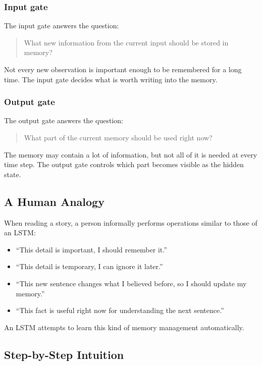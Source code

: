 \subsubsection{Input gate}

The input gate answers the question:
\begin{quote}
What new information from the current input should be stored in memory?
\end{quote}

Not every new observation is important enough to be remembered for a long time. The input gate decides what is worth writing into the memory.

\subsubsection{Output gate}

The output gate answers the question:
\begin{quote}
What part of the current memory should be used right now?
\end{quote}

The memory may contain a lot of information, but not all of it is needed at every time step. The output gate controls which part becomes visible as the hidden state.

\subsection{A Human Analogy}

When reading a story, a person informally performs operations similar to those of an LSTM:
\begin{itemize}
    \item ``This detail is important, I should remember it.''
    \item ``This detail is temporary, I can ignore it later.''
    \item ``This new sentence changes what I believed before, so I should update my memory.''
    \item ``This fact is useful right now for understanding the next sentence.''
\end{itemize}

An LSTM attempts to learn this kind of memory management automatically.

\subsection{Step-by-Step Intuition}

